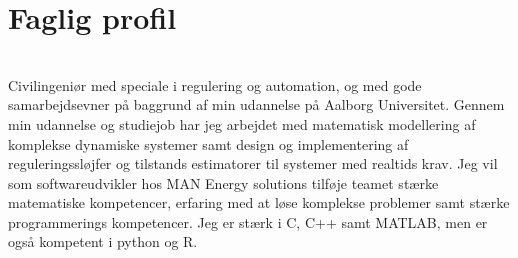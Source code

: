 \documentclass[a4paper]{twentysecondcv} %
\begin{document}

\aboutme{}




\skillstext{}


\makeprofile %


\section{Faglig profil}\\[0.2cm]
Civilingeniør med speciale i regulering og automation, og med gode samarbejdsevner på baggrund af min udannelse på Aalborg Universitet. Gennem min udannelse og studiejob har jeg arbejdet med matematisk modellering af komplekse dynamiske systemer samt design og implementering af reguleringssløjfer og tilstands estimatorer til systemer med realtids krav. Jeg vil som softwareudvikler hos MAN Energy solutions tilføje teamet stærke matematiske kompetencer, erfaring med at løse komplekse problemer samt stærke programmerings kompetencer. Jeg er stærk i C, C++ samt MATLAB, men er også kompetent i python og R.
\end{document}
